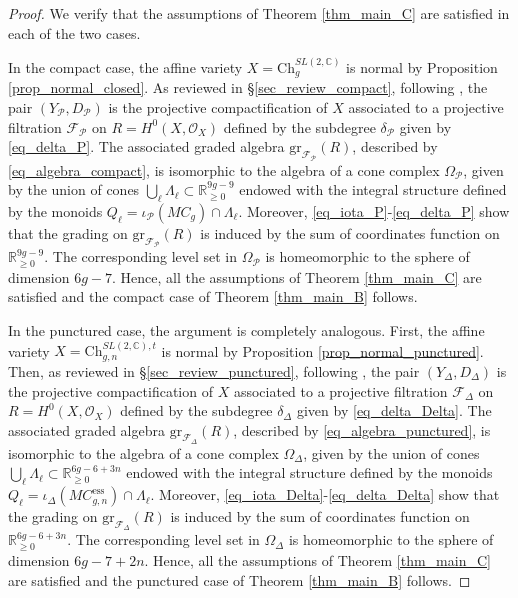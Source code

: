 \documentclass[12pt,letterpaper, reqno]{amsart}
\theoremstyle{defstyle} \newtheorem{definition}[theorem]{Definition}
\theoremstyle{remark}
\numberwithin{equation}{section}
\numberwithin{figure}{section}
\newcommand{\cF} {\mathcal{F}}
\newcommand{\CC} {\mathbb{C}}
\newcommand{\cO} {\mathcal{O}}
\newcommand{\RR} {\mathbb{R}}
\newcommand{\cP} {\mathcal{P}}
\begin{document}
\begin{proof}
We verify that the assumptions of Theorem \ref{thm_main_C} are satisfied in each of the two cases.

In the compact case, the affine variety $X=\mathrm{Ch}_g^{SL(2,\CC)}$ is normal by Proposition \ref{prop_normal_closed}. 
As reviewed in \S\ref{sec_review_compact}, following \cite{ayilliath2025geometric}, the pair $(Y_\cP, D_\cP)$ is the projective compactification of $X$ associated to a projective filtration $\cF_\cP$ on $R=H^0(X,\cO_X)$ defined by the subdegree $\delta_\cP$ given by \eqref{eq_delta_P}. 
The associated graded algebra $\mathrm{gr}_{\cF_\cP}(R)$, described by  \eqref{eq_algebra_compact},
is isomorphic to the algebra of a cone complex $\Omega_\cP$, given by the union of cones $\bigcup_\ell \Lambda_\ell \subset \RR_{\geq 0}^{9g-9}$ endowed with the integral structure defined by the monoids $Q_\ell=\iota_\cP(MC_g) \cap \Lambda_\ell$. Moreover, \eqref{eq_iota_P}-\eqref{eq_delta_P} show that the grading on $\mathrm{gr}_{\cF_\cP}(R)$
is induced by the sum of coordinates function on $\RR_{\geq 0}^{9g-9}$.
The corresponding level set in $\Omega_\cP$ is homeomorphic to the sphere of dimension $6g-7$. 
Hence, all the assumptions of Theorem \ref{thm_main_C} are satisfied and the compact case of Theorem \ref{thm_main_B} follows.

In the punctured case, the argument is completely analogous. First, the affine variety $X=\mathrm{Ch}_{g,n}^{SL(2,\CC), t}$ is normal by Proposition \ref{prop_normal_punctured}. 
Then, as reviewed in \S\ref{sec_review_punctured}, following \cite{farajzadeh2023compactifications}, the pair $(Y_\Delta, D_\Delta)$ is the projective compactification of $X$ associated to a projective filtration $\cF_\Delta$ on $R=H^0(X,\cO_X)$ defined by the subdegree $\delta_\Delta$ given by \eqref{eq_delta_Delta}. 
The associated graded algebra $\mathrm{gr}_{\cF_\Delta}(R)$, described by  \eqref{eq_algebra_punctured},
is isomorphic to the algebra of a cone complex $\Omega_\Delta$, given by the union of cones $\bigcup_\ell \Lambda_\ell \subset \RR_{\geq 0}^{6g-6+3n}$ endowed with the integral structure defined by the monoids $Q_\ell=\iota_\Delta(MC_{g,n}^{\mathrm{ess}}) \cap \Lambda_\ell$. Moreover, \eqref{eq_iota_Delta}-\eqref{eq_delta_Delta} show that the grading on $\mathrm{gr}_{\cF_\Delta}(R)$
is induced by the sum of coordinates function on $\RR_{\geq 0}^{6g-6+3n}$.
The corresponding level set in $\Omega_\Delta$ is homeomorphic to the sphere of dimension $6g-7+2n$. 
Hence, all the assumptions of Theorem \ref{thm_main_C} are satisfied and the punctured case of Theorem \ref{thm_main_B} follows.
\end{proof}
\end{document}
